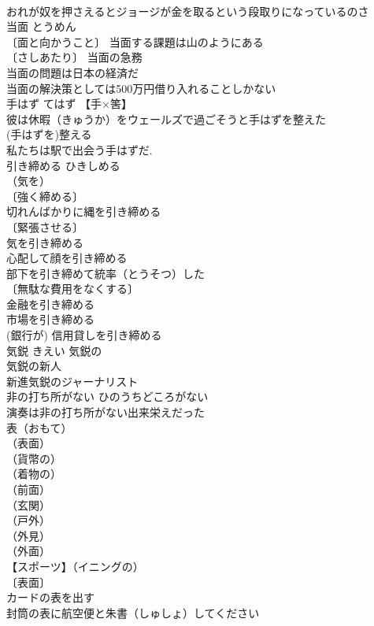 \documentclass[8pt]{extreport}
\begin{document}
\begin{CJK}{UTF8}{min}
\\	おれが奴を押さえるとジョージが金を取るという段取りになっているのさ 
\\	当面	とうめん	
\\	〔面と向かうこと〕 当面する課題は山のようにある 
\\	〔さしあたり〕 当面の急務 
\\	当面の問題は日本の経済だ 
\\	当面の解決策としては500万円借り入れることしかない 
\\	手はず	てはず	【手×筈】 
\\	彼は休暇（きゅうか）をウェールズで過ごそうと手はずを整えた 
\\	(手はずを)整える 
\\	私たちは駅で出会う手はずだ. 
\\	引き締める	ひきしめる	
\\	（気を）
\\	〔強く締める〕
\\	切れんばかりに縄を引き締める 
\\	〔緊張させる〕
\\	気を引き締める 
\\	心配して顔を引き締める 
\\	部下を引き締めて統率（とうそつ）した 
\\	〔無駄な費用をなくする〕
\\	金融を引き締める 
\\	市場を引き締める 
\\	(銀行が) 信用貸しを引き締める 
\\	気鋭	きえい	気鋭の 
\\	気鋭の新人 
\\	新進気鋭のジャーナリスト 
\\	非の打ち所がない	ひのうちどころがない	
\\	演奏は非の打ち所がない出来栄えだった 
\\	表（おもて）		
\\	（表面）
\\	（貨幣の）
\\	（着物の）
\\	（前面）
\\	（玄関）
\\	（戸外）
\\	（外見）
\\	（外面）
\\	【スポーツ】（イニングの）
\\	〔表面〕
\\	カードの表を出す 
\\	封筒の表に航空便と朱書（しゅしょ）してください 

\end{CJK}
\end{document}
